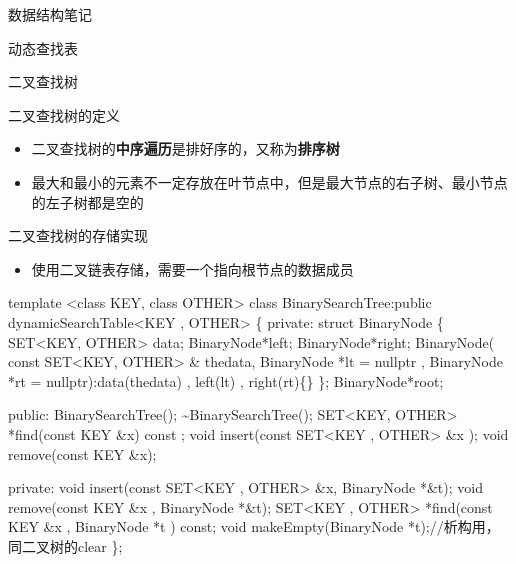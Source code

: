 \documentclass[
  ignorenonframetext,
]{beamer}
\newenvironment{Shaded}{}{}
\newcommand{\NormalTok}[1]{#1}
\providecommand{\tightlist}{%
  \setlength{\itemsep}{0pt}\setlength{\parskip}{0pt}}
\begin{document}
\begin{frame}[fragile]{数据结构笔记}
\begin{block}{动态查找表}
\begin{block}{二叉查找树}
\begin{block}{二叉查找树的定义}
\begin{itemize}
  \begin{itemize}
  \tightlist
  \item
    \texttt{p} 的左子树中所有节点的值都小于 \texttt{p} 的值
  \item
    \texttt{p} 的右子树中所有节点的值都大于 \texttt{p} 的值
  \item
    \texttt{p} 的左子树和右子树都是二叉查找树
  \end{itemize}
\item
  二叉查找树的\textbf{中序遍历}是排好序的，又称为\textbf{排序树}
\item
  最大和最小的元素不一定存放在叶节点中，但是最大节点的右子树、最小节点的左子树都是空的
\end{itemize}
\end{block}

\begin{block}{二叉查找树的存储实现}
\protect{}\label{ux4e8cux53c9ux67e5ux627eux6811ux7684ux5b58ux50a8ux5b9eux73b0}
\begin{itemize}
\tightlist
\item
  使用二叉链表存储，需要一个指向根节点的数据成员
\end{itemize}

\begin{Shaded}
\begin{Highlighting}[]
\NormalTok{template \textless{}class KEY, class OTHER\textgreater{}}
\NormalTok{class BinarySearchTree:public dynamicSearchTable\textless{}KEY , OTHER\textgreater{}}
\NormalTok{\{}
\NormalTok{  private:}
\NormalTok{    struct BinaryNode}
\NormalTok{    \{}
\NormalTok{      SET\textless{}KEY, OTHER\textgreater{} data;}
\NormalTok{      BinaryNode*left;}
\NormalTok{      BinaryNode*right;}
\NormalTok{      BinaryNode( const SET\textless{}KEY, OTHER\textgreater{} \& thedata,}
\NormalTok{      BinaryNode *lt = nullptr , BinaryNode *rt = nullptr):data(thedata) , left(lt) , right(rt)\{\}}
\NormalTok{    \};}
\NormalTok{    BinaryNode*root;}

\NormalTok{  public:}
\NormalTok{    BinarySearchTree();}
\NormalTok{    \textasciitilde{}BinarySearchTree();}
\NormalTok{    SET\textless{}KEY, OTHER\textgreater{} *find(const KEY \&x) const ;}
\NormalTok{    void insert(const SET\textless{}KEY , OTHER\textgreater{} \&x );}
\NormalTok{    void remove(const KEY \&x);}
  
\NormalTok{  private:}
\NormalTok{    void insert(const SET\textless{}KEY , OTHER\textgreater{} \&x, BinaryNode *\&t);}
\NormalTok{    void remove(const KEY \&x , BinaryNode *\&t);}
\NormalTok{    SET\textless{}KEY , OTHER\textgreater{} *find(const KEY \&x , BinaryNode *t ) const;}
\NormalTok{    void makeEmpty(BinaryNode *t);//析构用，同二叉树的clear}
\NormalTok{\};}
\end{Highlighting}
\end{Shaded}
\end{block}


\end{block}
\end{block}
\end{frame}
\end{document}
